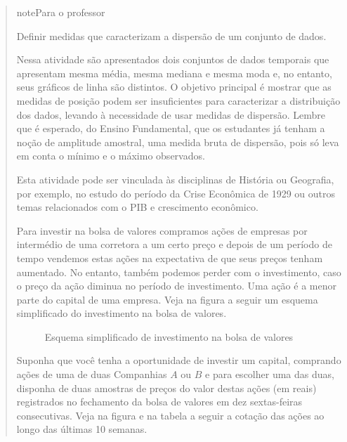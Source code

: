 \begin{quote}

\begin{sphinxadmonition}{note}{Para o professor}

 Definir medidas que caracterizam a dispersão de um conjunto de dados.

 Nessa atividade são apresentados dois conjuntos de dados temporais que apresentam mesma média, mesma mediana e mesma moda e, no entanto, seus gráficos de linha são distintos. O objetivo principal é mostrar que as medidas de posição podem ser insuficientes para caracterizar a distribuição dos dados, levando à necessidade de usar medidas de dispersão. Lembre que é esperado, do Ensino Fundamental, que os estudantes já tenham a noção de amplitude amostral, uma medida bruta de dispersão, pois só leva em conta o mínimo e o máximo observados.

Esta atividade pode ser vinculada às disciplinas de História ou Geografia, por exemplo, no estudo do período da Crise Econômica de 1929 ou outros temas relacionados com o PIB e crescimento econômico.
\end{sphinxadmonition}

Para investir na bolsa de valores compramos ações de empresas por intermédio de uma corretora a um certo preço e depois de um período de tempo vendemos estas ações na expectativa de que seus preços tenham aumentado. No entanto, também podemos perder com o investimento, caso o preço da ação diminua no período de investimento. Uma ação é a menor parte do capital de uma empresa. Veja na figura a seguir um esquema simplificado do investimento na bolsa de valores.

\begin{figure}[H]
\centering
\capstart

\noindent{}
\caption{Esquema simplificado de investimento na bolsa de valores}\label{\detokenize{PE104-3:fig-ativ-bolsa-de-valores}}\label{\detokenize{PE104-3:id1}}\end{figure}

Suponha que você tenha a oportunidade de investir um capital, comprando ações de uma de duas  Companhias \(A\) ou \(B\) e para escolher uma das duas, disponha de duas amostras de preços do valor destas ações (em reais) registrados no fechamento da bolsa de valores em dez sextas-feiras consecutivas. Veja na figura e na tabela a seguir a cotação das ações ao longo das últimas 10 semanas.


\end{quote}
